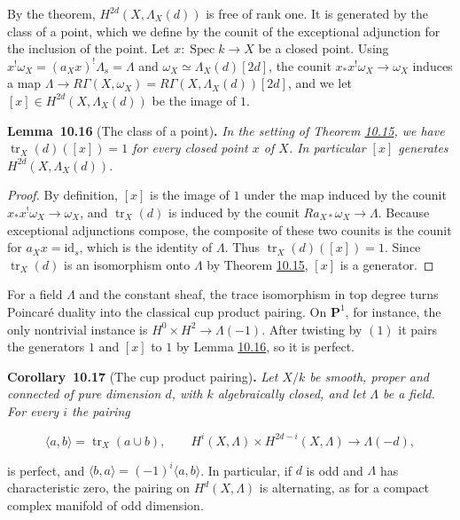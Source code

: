 \documentclass[11pt]{article}
\newenvironment{bpstatement}[2]{\par\addvspace{0.6\baselineskip}\noindent\textbf{#1}#2\textbf{.}\enspace\ignorespaces}
  {\par\addvspace{0.4\baselineskip}}
\newenvironment{bpstatementit}[2]{\begin{bpstatement}{#1}{#2}\itshape\ignorespaces}{\end{bpstatement}}
\begin{document}
\label{bp48}%
By the theorem, \(H^{2d}(X,\Lambda_X(d))\) is free of rank one. It is generated by the class of a point, which we define by the counit of the exceptional adjunction for the inclusion of the point. Let \(x:\operatorname{Spec}k\to X\) be a closed point. Using \(x^!\omega_X=(a_Xx)^!\Lambda_s=\Lambda\) and \(\omega_X\simeq\Lambda_X(d)[2d]\), the counit \(x_*x^!\omega_X\to\omega_X\) induces a map \(\Lambda\to R\Gamma(X,\omega_X)=R\Gamma(X,\Lambda_X(d))[2d]\), and we let \([x]\in H^{2d}(X,\Lambda_X(d))\) be the image of \(1\).

\label{bp49}%
\begin{bpstatementit}{Lemma~10.16}{ (The class of a point)}
In the setting of Theorem \hyperref[bp46]{10.15}, we have \(\operatorname{tr}_X(d)([x])=1\) for every closed point \(x\) of \(X\). In particular \([x]\) generates \(H^{2d}(X,\Lambda_X(d))\).
\end{bpstatementit}

\begin{proof}[{Proof}]\label{bp50}%
By definition, \([x]\) is the image of \(1\) under the map induced by the counit \(x_*x^!\omega_X\to\omega_X\), and \(\operatorname{tr}_X(d)\) is induced by the counit \(Ra_{X*}\omega_X\to\Lambda\). Because exceptional adjunctions compose, the composite of these two counits is the counit for \(a_Xx=\mathrm{id}_s\), which is the identity of \(\Lambda\). Thus \(\operatorname{tr}_X(d)([x])=1\). Since \(\operatorname{tr}_X(d)\) is an isomorphism onto \(\Lambda\) by Theorem \hyperref[bp46]{10.15}, \([x]\) is a generator.
\end{proof}

\label{bp51}%
For a field \(\Lambda\) and the constant sheaf, the trace isomorphism in top degree turns Poincaré duality into the classical cup product pairing. On \(\mathbf P^1\), for instance, the only nontrivial instance is \(H^0\times H^2\to\Lambda(-1)\). After twisting by \((1)\) it pairs the generators \(1\) and \([x]\) to \(1\) by Lemma \hyperref[bp49]{10.16}, so it is perfect.

\label{bp52}%
\begin{bpstatementit}{Corollary~10.17}{ (The cup product pairing)}
Let \(X/k\) be smooth, proper and connected of pure dimension \(d\), with \(k\) algebraically closed, and let \(\Lambda\) be a field. For every \(i\) the pairing

\[
\langle a,b\rangle=\operatorname{tr}_X(a\cup b),\qquad
H^i(X,\Lambda)\times H^{2d-i}(X,\Lambda)\longrightarrow\Lambda(-d),
\]

is perfect, and \(\langle b,a\rangle=(-1)^i\langle a,b\rangle\). In particular, if \(d\) is odd and \(\Lambda\) has characteristic zero, the pairing on \(H^d(X,\Lambda)\) is alternating, as for a compact complex manifold of odd dimension.
\end{bpstatementit}
\end{document}
